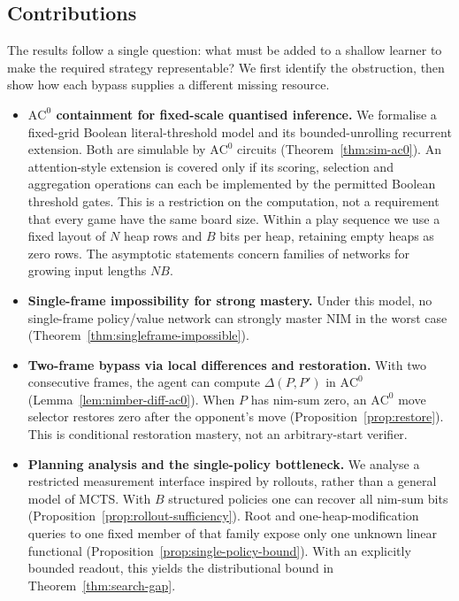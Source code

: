 \documentclass[twoside,11pt]{article}
\newcommand{\AC}{\mathrm{AC}}
\numberwithin{theorem}{section}
\numberwithin{equation}{section}
\begin{document}
\subsection{Contributions}
\label{sec:contrib}

The results follow a single question: what must be added to a shallow learner to make the required strategy representable? We first identify the obstruction, then show how each bypass supplies a different missing resource.

\begin{itemize}[leftmargin=*]
\item \textbf{$\AC^0$ containment for fixed-scale quantised inference.}
We formalise a fixed-grid Boolean literal-threshold model and its bounded-unrolling recurrent extension. Both are simulable by $\AC^0$ circuits (Theorem~\ref{thm:sim-ac0}). An attention-style extension is covered only if its scoring, selection and aggregation operations can each be implemented by the permitted Boolean threshold gates. This is a restriction on the computation, not a requirement that every game have the same board size. Within a play sequence we use a fixed layout of $N$ heap rows and $B$ bits per heap, retaining empty heaps as zero rows. The asymptotic statements concern families of networks for growing input lengths $NB$.

\item \textbf{Single-frame impossibility for strong mastery.}
Under this model, no single-frame policy/value network can strongly master NIM in the worst case (Theorem~\ref{thm:singleframe-impossible}).

\item \textbf{Two-frame bypass via local differences and restoration.}
With two consecutive frames, the agent can compute $\Delta(P,P')$ in $\AC^0$ (Lemma~\ref{lem:nimber-diff-ac0}). When $P$ has nim-sum zero, an $\AC^0$ move selector restores zero after the opponent's move (Proposition~\ref{prop:restore}). This is conditional restoration mastery, not an arbitrary-start verifier.

\item \textbf{Planning analysis and the single-policy bottleneck.}
We analyse a restricted measurement interface inspired by rollouts, rather than a general model of MCTS.
With $B$ structured policies one can recover all nim-sum bits (Proposition~\ref{prop:rollout-sufficiency}). Root and one-heap-modification queries to one fixed member of that family expose only one unknown linear functional (Proposition~\ref{prop:single-policy-bound}). With an explicitly bounded readout, this yields the distributional bound in Theorem~\ref{thm:search-gap}.


\end{itemize}
\end{document}
